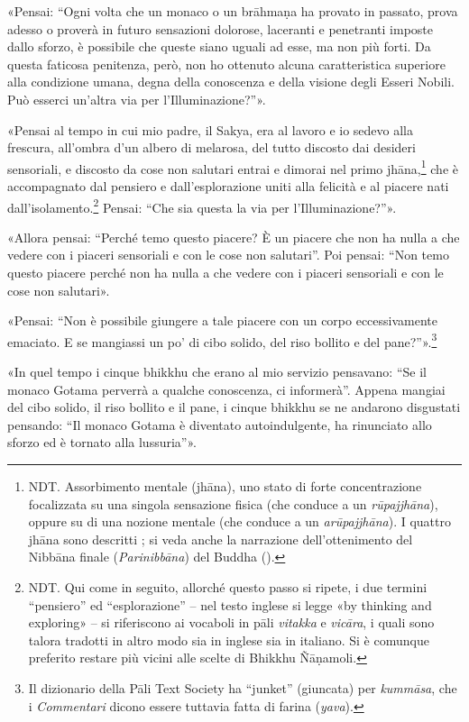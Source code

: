 

«Pensai: “Ogni volta che un monaco o un brāhmaṇa ha provato in passato,
prova adesso o proverà in futuro sensazioni dolorose, laceranti e
penetranti imposte dallo sforzo, è possibile che queste siano uguali ad
esse, ma non più forti. Da questa faticosa penitenza, però, non ho
ottenuto alcuna caratteristica superiore alla condizione umana, degna
della conoscenza e della visione degli Esseri Nobili. Può esserci
un’altra via per l’Illuminazione?”».


«Pensai al tempo in cui mio padre, il Sakya, era al lavoro e io sedevo
alla frescura, all’ombra d’un albero di melarosa, del tutto discosto dai
desideri sensoriali, e discosto da cose non salutari entrai e dimorai
nel primo jhāna,\footnote{NDT. Assorbimento mentale (jhāna), uno stato di forte concentrazione focalizzata su una singola sensazione fisica (che conduce a un \emph{rūpajjhāna}), oppure su di una nozione mentale (che conduce a un \emph{arūpajjhāna}). I quattro jhāna sono descritti \hyperlink{pag27}{}; si veda anche la narrazione dell’ottenimento del Nibbāna finale (\emph{Parinibbāna}) del Buddha (\hyperlink{cap-15-L-ultimo-anno#pag364}{}).} che è accompagnato dal pensiero e
dall’esplorazione uniti alla felicità e al piacere nati
dall’isolamento.\footnote{NDT. Qui come in seguito, allorché questo passo si ripete, i due termini “pensiero” ed “esplorazione” – nel testo inglese si legge «by thinking and exploring» – si riferiscono ai vocaboli in pāli \emph{vitakka} e \emph{vicāra}, i quali sono talora tradotti in altro modo sia in inglese sia in italiano. Si è comunque preferito restare più vicini alle scelte di Bhikkhu Ñāṇamoli.} Pensai: “Che sia questa la via per
l’Illuminazione?”».


«Allora pensai: “Perché temo questo piacere? È un piacere che non ha
nulla a che vedere con i piaceri sensoriali e con le cose non salutari”.
Poi pensai: “Non temo questo piacere perché non ha nulla a che vedere
con i piaceri sensoriali e con le cose non salutari».


«Pensai: “Non è possibile giungere a tale piacere con un corpo
eccessivamente emaciato. E se mangiassi un po’ di cibo solido, del riso
bollito e del pane?”».\footnote{Il dizionario della Pāli Text Society ha “junket” (giuncata) per \emph{kummāsa}, che i \emph{Commentari} dicono essere tuttavia fatta di farina (\emph{yava}).}


«In quel tempo i cinque bhikkhu che erano al mio servizio pensavano: “Se
il monaco Gotama perverrà a qualche conoscenza, ci informerà”. Appena
mangiai del cibo solido, il riso bollito e il pane, i cinque bhikkhu se
ne andarono disgustati pensando: “Il monaco Gotama è diventato
autoindulgente, ha rinunciato allo sforzo ed è tornato alla lussuria”».


